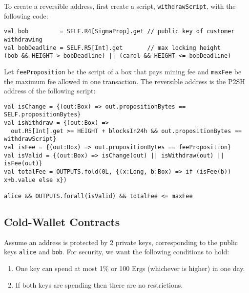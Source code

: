 \documentclass[11pt]{article}
\begin{document}
To create a reversible address, first create a script, \texttt{withdrawScript}, with the following code:
\begin{verbatim}
val bob         = SELF.R4[SigmaProp].get // public key of customer withdrawing
val bobDeadline = SELF.R5[Int].get       // max locking height
(bob && HEIGHT > bobDeadline) || (carol && HEIGHT <= bobDeadline)
\end{verbatim}

Let \texttt{feeProposition} be the script of a box that pays mining fee and \texttt{maxFee} be the maximum fee allowed in one transaction. The reversible address is the P2SH address of the following script:
\begin{verbatim}
val isChange = {(out:Box) => out.propositionBytes == SELF.propositionBytes}
val isWithdraw = {(out:Box) => 
  out.R5[Int].get >= HEIGHT + blocksIn24h && out.propositionBytes == withdrawScript}
val isFee = {(out:Box) => out.propositionBytes == feeProposition}
val isValid = {(out:Box) => isChange(out) || isWithdraw(out) || isFee(out)}
val totalFee = OUTPUTS.fold(0L, {(x:Long, b:Box) => if (isFee(b)) x+b.value else x})

alice && OUTPUTS.forall(isValid) && totalFee <= maxFee
\end{verbatim}

\subsection{Cold-Wallet Contracts}

Assume an address is protected by 2 private keys, corresponding to the public keys \texttt{alice} and \texttt{bob}. For security, we want the following conditions to hold:

\begin{enumerate}
	\item One key can spend at most 1\% or 100 Ergs (whichever is higher) in one day.
	\item If both keys are spending then there are no restrictions. 
\end{enumerate}
\end{document}
